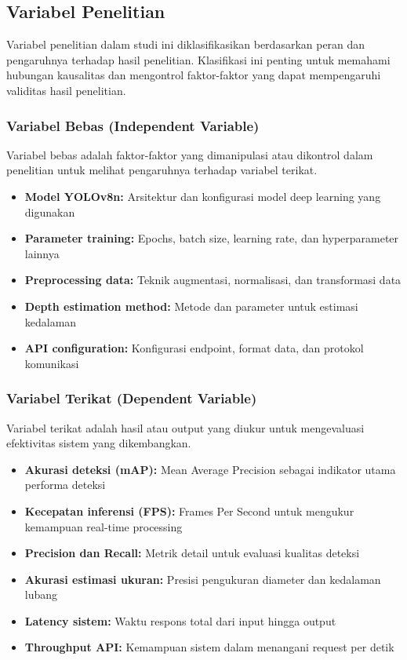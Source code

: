 \documentclass[12pt,a4paper]{report}
\begin{document}
\subsection{Variabel Penelitian}

Variabel penelitian dalam studi ini diklasifikasikan berdasarkan peran dan pengaruhnya terhadap hasil penelitian. Klasifikasi ini penting untuk memahami hubungan kausalitas dan mengontrol faktor-faktor yang dapat mempengaruhi validitas hasil penelitian.

\subsubsection{Variabel Bebas (Independent Variable)}

Variabel bebas adalah faktor-faktor yang dimanipulasi atau dikontrol dalam penelitian untuk melihat pengaruhnya terhadap variabel terikat.

\begin{itemize}
    \item \textbf{Model YOLOv8n:} Arsitektur dan konfigurasi model deep learning yang digunakan
    \item \textbf{Parameter training:} Epochs, batch size, learning rate, dan hyperparameter lainnya
    \item \textbf{Preprocessing data:} Teknik augmentasi, normalisasi, dan transformasi data
    \item \textbf{Depth estimation method:} Metode dan parameter untuk estimasi kedalaman
    \item \textbf{API configuration:} Konfigurasi endpoint, format data, dan protokol komunikasi
\end{itemize}

\subsubsection{Variabel Terikat (Dependent Variable)}

Variabel terikat adalah hasil atau output yang diukur untuk mengevaluasi efektivitas sistem yang dikembangkan.

\begin{itemize}
    \item \textbf{Akurasi deteksi (mAP):} Mean Average Precision sebagai indikator utama performa deteksi
    \item \textbf{Kecepatan inferensi (FPS):} Frames Per Second untuk mengukur kemampuan real-time processing
    \item \textbf{Precision dan Recall:} Metrik detail untuk evaluasi kualitas deteksi
    \item \textbf{Akurasi estimasi ukuran:} Presisi pengukuran diameter dan kedalaman lubang
    \item \textbf{Latency sistem:} Waktu respons total dari input hingga output
    \item \textbf{Throughput API:} Kemampuan sistem dalam menangani request per detik
\end{itemize}
\end{document}
